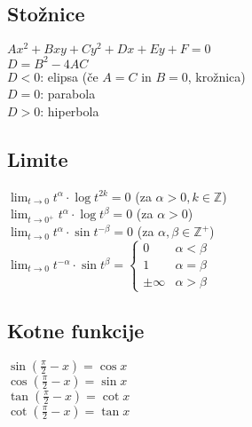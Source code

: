 \documentclass{formule}
\begin{document}
\subsection*{Stožnice}
\(A x^2 + B xy + C y^2 + D x + E y + F = 0\) \\ \(D = B^2 - 4 A C\) \\
\(D < 0\): elipsa (če \(A = C\) in \(B = 0\), krožnica) \\
\(D = 0\): parabola \\
\(D > 0\): hiperbola

\subsection*{Limite}
\(\lim_{t \to 0} t^{\alpha} \cdot \log t^{2k} = 0\) (za \(\alpha > 0, k \in \mathbb{Z}\)) \\
\(\lim_{t \to 0^{+}} t^{\alpha} \cdot \log t^{\beta} = 0\) (za \(\alpha > 0\)) \\
\(\lim_{t \to 0} t^{\alpha} \cdot \sin t^{- \beta} = 0\) (za \(\alpha, \beta \in \mathbb{Z}^{+}\)) \\
\(\lim_{t \to 0} t^{- \alpha} \cdot \sin t^{\beta} =
\begin{cases}
    0 & \alpha < \beta \\
    1 & \alpha = \beta \\
    \pm \infty & \alpha > \beta
\end{cases}\)

\subsection*{Kotne funkcije}
\vspace*{-1.1em}%
\begin{multicols}{2}
\(\sin (\frac{\pi}{2} - x) = \cos x\) \\
\(\cos (\frac{\pi}{2} - x) = \sin x\) \\
\(\tan (\frac{\pi}{2} - x) = \cot x\) \\
\(\cot (\frac{\pi}{2} - x) = \tan x\)
\end{multicols}
\vspace*{-1.1em}
\end{document}
